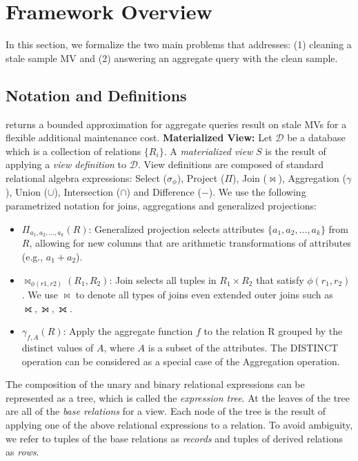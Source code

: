 \vspace{-1em}
\section{Framework Overview}\label{sec-arch}
In this section, we formalize the two main problems that \svc addresses: (1) cleaning a stale sample MV and (2) answering an aggregate query with the clean sample.

\subsection{Notation and Definitions}\label{notation}
\svc returns a bounded approximation for aggregate queries result on stale MVs for a flexible additional maintenance cost.
\noindent \textbf{Materialized View:} Let $\mathcal{D}$ be a database which is a collection of relations $\{R_i\}$. A \emph{materialized view} $S$ is the result of applying a \emph{view definition} to $\mathcal{D}$. 
View definitions are composed of standard relational algebra expressions: Select ($\sigma_{\phi}$), Project ($\Pi$), Join ($\bowtie$), Aggregation ($\gamma$), Union ($\cup$), Intersection ($\cap$) and Difference ($-$). 
We use the following parametrized notation for joins, aggregations and generalized projections:
\begin{itemize}[noitemsep] \sloppy
	\item $\Pi_{a_1,a_2,...,a_k}(R)$: Generalized projection selects attributes $\{a_1,a_2,...,a_k\}$ from $R$, allowing for new columns that are arithmetic transformations of attributes (e.g., $a_1+a_2$).
	\item $\bowtie_{\phi (r1,r2)}(R_1,R_2)$: Join selects all tuples in $R_1 \times R_2$ that satisfy $\phi (r_1,r_2)$. We use $\bowtie$ to denote all types of joins even extended outer joins such as $\rightouterjoin,\leftouterjoin,\fullouterjoin$.
	\item $\gamma_{f,A}(R)$: Apply the aggregate function $f$ to the relation R grouped by the distinct values of $A$, where $A$ is a subset of the attributes.  
	The DISTINCT operation can be considered as a special case of the Aggregation operation. 
\end{itemize}
The composition of the unary and binary relational expressions can be represented as a tree, which is called the \emph{expression tree}.
At the leaves of the tree are all of the \emph{base relations} for a view.
Each node of the tree is the result of applying one of the above relational expressions to a relation.
To avoid ambiguity, we refer to tuples of the base relations as \emph{records} and tuples of derived relations as \emph{rows}.

